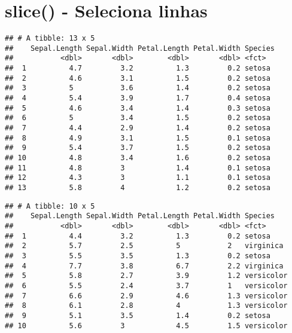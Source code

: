 \documentclass[]{book}
\newenvironment{Shaded}{\begin{snugshade}}{\end{snugshade}}
\newcommand{\DataTypeTok}[1]{\textcolor[rgb]{0.13,0.29,0.53}{#1}}
\newcommand{\DecValTok}[1]{\textcolor[rgb]{0.00,0.00,0.81}{#1}}
\newcommand{\KeywordTok}[1]{\textcolor[rgb]{0.13,0.29,0.53}{\textbf{#1}}}
\newcommand{\NormalTok}[1]{#1}
\newcommand{\OperatorTok}[1]{\textcolor[rgb]{0.81,0.36,0.00}{\textbf{#1}}}
\newcommand{\StringTok}[1]{\textcolor[rgb]{0.31,0.60,0.02}{#1}}
\begin{document}
\hypertarget{slice---seleciona-linhas}{%
\section{slice() - Seleciona linhas}\label{slice---seleciona-linhas}}

\begin{Shaded}
\end{Shaded}

\begin{verbatim}
## # A tibble: 13 x 5
##    Sepal.Length Sepal.Width Petal.Length Petal.Width Species
##           <dbl>       <dbl>        <dbl>       <dbl> <fct>  
##  1          4.7         3.2          1.3         0.2 setosa 
##  2          4.6         3.1          1.5         0.2 setosa 
##  3          5           3.6          1.4         0.2 setosa 
##  4          5.4         3.9          1.7         0.4 setosa 
##  5          4.6         3.4          1.4         0.3 setosa 
##  6          5           3.4          1.5         0.2 setosa 
##  7          4.4         2.9          1.4         0.2 setosa 
##  8          4.9         3.1          1.5         0.1 setosa 
##  9          5.4         3.7          1.5         0.2 setosa 
## 10          4.8         3.4          1.6         0.2 setosa 
## 11          4.8         3            1.4         0.1 setosa 
## 12          4.3         3            1.1         0.1 setosa 
## 13          5.8         4            1.2         0.2 setosa
\end{verbatim}

\begin{Shaded}
\end{Shaded}

\begin{verbatim}
## # A tibble: 10 x 5
##    Sepal.Length Sepal.Width Petal.Length Petal.Width Species   
##           <dbl>       <dbl>        <dbl>       <dbl> <fct>     
##  1          4.4         3.2          1.3         0.2 setosa    
##  2          5.7         2.5          5           2   virginica 
##  3          5.5         3.5          1.3         0.2 setosa    
##  4          7.7         3.8          6.7         2.2 virginica 
##  5          5.8         2.7          3.9         1.2 versicolor
##  6          5.5         2.4          3.7         1   versicolor
##  7          6.6         2.9          4.6         1.3 versicolor
##  8          6.1         2.8          4           1.3 versicolor
##  9          5.1         3.5          1.4         0.2 setosa    
## 10          5.6         3            4.5         1.5 versicolor
\end{verbatim}
\end{document}
